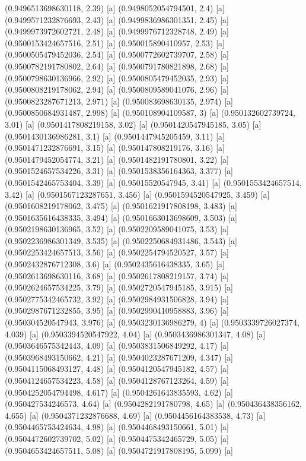 {{{(0.9496513698630118, 2.39) [a] 
(0.9498052054794501, 2.4) [a] 
(0.9499571232876693, 2.43) [a] 
(0.9499836986301351, 2.45) [a] 
(0.9499973972602721, 2.48) [a] 
(0.9499976712328748, 2.49) [a] 
(0.9500153424657516, 2.51) [a] 
(0.950015890410957, 2.53) [a] 
(0.9500505479452036, 2.54) [a] 
(0.9500772602739707, 2.58) [a] 
(0.9500782191780802, 2.64) [a] 
(0.9500791780821898, 2.68) [a] 
(0.9500798630136966, 2.92) [a] 
(0.9500805479452035, 2.93) [a] 
(0.9500808219178062, 2.94) [a] 
(0.9500809589041076, 2.96) [a] 
(0.9500823287671213, 2.971) [a] 
(0.950083698630135, 2.974) [a] 
(0.9500850684931487, 2.998) [a] 
(0.950108904109587, 3) [a] 
(0.950132602739724, 3.01) [a] 
(0.9501417808219158, 3.02) [a] 
(0.9501420547945185, 3.05) [a] 
(0.9501430136986281, 3.1) [a] 
(0.9501447945205459, 3.11) [a] 
(0.9501471232876691, 3.15) [a] 
(0.950147808219176, 3.16) [a] 
(0.9501479452054774, 3.21) [a] 
(0.9501482191780801, 3.22) [a] 
(0.9501524657534226, 3.31) [a] 
(0.9501538356164363, 3.377) [a] 
(0.9501542465753404, 3.39) [a] 
(0.95015520547945, 3.41) [a] 
(0.9501553424657514, 3.42) [a] 
(0.9501567123287651, 3.456) [a] 
(0.9501594520547925, 3.459) [a] 
(0.9501608219178062, 3.475) [a] 
(0.9501621917808198, 3.483) [a] 
(0.9501635616438335, 3.494) [a] 
(0.9501663013698609, 3.503) [a] 
(0.9502198630136965, 3.52) [a] 
(0.9502209589041075, 3.53) [a] 
(0.9502236986301349, 3.535) [a] 
(0.9502250684931486, 3.543) [a] 
(0.9502253424657513, 3.56) [a] 
(0.9502254794520527, 3.57) [a] 
(0.9502432876712308, 3.6) [a] 
(0.9502435616438335, 3.65) [a] 
(0.9502613698630116, 3.68) [a] 
(0.9502617808219157, 3.74) [a] 
(0.9502624657534225, 3.79) [a] 
(0.9502720547945185, 3.915) [a] 
(0.9502775342465732, 3.92) [a] 
(0.9502984931506828, 3.94) [a] 
(0.9502987671232855, 3.95) [a] 
(0.9502990410958883, 3.96) [a] 
(0.950304520547943, 3.976) [a] 
(0.9503230136986279, 4) [a] 
(0.9503339726027374, 4.039) [a] 
(0.9503394520547922, 4.04) [a] 
(0.9503436986301347, 4.08) [a] 
(0.9503646575342443, 4.09) [a] 
(0.9503831506849292, 4.17) [a] 
(0.9503968493150662, 4.21) [a] 
(0.9504023287671209, 4.347) [a] 
(0.9504115068493127, 4.48) [a] 
(0.9504120547945182, 4.57) [a] 
(0.9504124657534223, 4.58) [a] 
(0.9504128767123264, 4.59) [a] 
(0.9504252054794498, 4.617) [a] 
(0.9504261643835593, 4.62) [a] 
(0.950427534246573, 4.64) [a] 
(0.9504282191780798, 4.65) [a] 
(0.950436438356162, 4.655) [a] 
(0.9504371232876688, 4.69) [a] 
(0.9504456164383538, 4.73) [a] 
(0.9504465753424634, 4.98) [a] 
(0.9504468493150661, 5.01) [a] 
(0.9504472602739702, 5.02) [a] 
(0.9504475342465729, 5.05) [a] 
(0.9504653424657511, 5.08) [a] 
(0.9504721917808195, 5.099) [a] 
}}}
